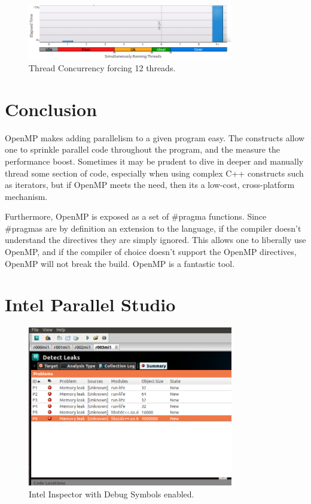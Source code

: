 \documentclass[journal,10pt,onecolumn]{IEEEtran}
\begin{document}
\begin{figure}[!t]
\begin{center}
\includegraphics[width=0.8\textwidth]{figures/12_threaded_matrix_thread_concurrent_histogram.png}
\caption{Thread Concurrency forcing 12 threads.}
\label{fig:12_threaded_matrix_concurrent}
\end{center}
\end{figure}


\section{Conclusion}
OpenMP makes adding parallelism to a given program easy. The constructs allow one to sprinkle
parallel code throughout the program, and the measure the performance boost. Sometimes it
may be prudent to dive in deeper and manually thread some section of code, especially when using
complex C++ constructs such as iterators, but if OpenMP
meets the need, then its a low-cost, cross-platform mechanism.

Furthermore, OpenMP is exposed as a set of \#pragma functions. Since \#pragmas are by 
definition an extension to the language, if the compiler doesn't understand the directives they
are simply ignored. This allows one to liberally use OpenMP, and if the compiler of choice doesn't
support the OpenMP directives, OpenMP will not break the build.  OpenMP is a fantastic tool.

\appendices
\section{Intel Parallel Studio}
\label{sec:Intel-Tools}

\begin{figure}[!t]
\begin{center}
\includegraphics[width=0.8\textwidth]{figures/fileMep7k0_Memory_Analysis.png}
\caption{Intel Inspector with Debug Symbols enabled.}
\label{fig:intentional_memory_leak}
\end{center}
\end{figure}
\end{document}
